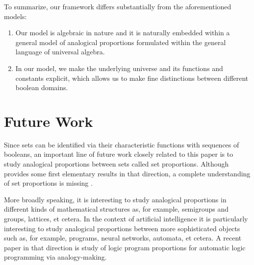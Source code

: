 \documentclass[11pt]{amsart}
\theoremstyle{definition} %
\begin{document}
To summarize, our framework differs substantially from the aforementioned models:
\begin{enumerate}
	\item Our model is algebraic in nature and it is naturally embedded within a general model of analogical proportions formulated within the general language of universal algebra.

	\item In our model, we make the underlying universe and its functions and constants explicit, which allows us to make fine distinctions between different boolean domains.%

\end{enumerate}

\section{Future Work}

Since sets can be identified via their characteristic functions with sequences of booleans, an important line of future work closely related to this paper is to study analogical proportions between sets called set proportions. Although  provides some first elementary results in that direction, a complete understanding of set proportions is missing \cite<but see>[§4.2]{Lepage03}.

More broadly speaking, it is interesting to study analogical proportions in different kinds of mathematical structures as, for example, semigroups and groups, lattices, et cetera. In the context of artificial intelligence it is particularly interesting to study analogical proportions between more sophisticated objects such as, for example, programs, neural networks, automata, et cetera. A recent paper in that direction is  study of  logic program proportions for automatic logic programming via analogy-making.
\end{document}
